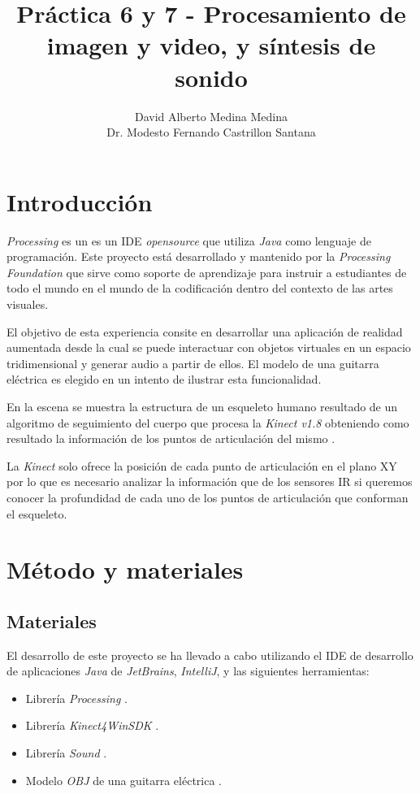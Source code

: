 \documentclass[10pt,a4paper]{report}
\author{David Alberto Medina Medina
	\\
	Dr. Modesto Fernando Castrillon Santana}
\title{Práctica 6 y 7 - Procesamiento de imagen y video, y síntesis de sonido}
\begin{document}
	\maketitle
	\tableofcontents
	
	\chapter{Introducción}
	\textit{Processing} es un es un IDE \textit{opensource} que utiliza \textit{Java} como lenguaje de programación. Este proyecto está desarrollado y mantenido por la \textit{Processing Foundation} que sirve como soporte de aprendizaje para instruir a estudiantes de todo el mundo en el mundo de la codificación dentro del contexto de las artes visuales.
	
	El objetivo de esta experiencia consite en desarrollar una aplicación de realidad aumentada desde la cual se puede interactuar con objetos virtuales en un espacio tridimensional y generar audio a partir de ellos. El modelo de una guitarra eléctrica es elegido en un intento de ilustrar esta funcionalidad. 
	
	En la escena se muestra la estructura de un esqueleto humano resultado de un algoritmo de seguimiento del cuerpo que procesa la \textit{Kinect v1.8} obteniendo como resultado la información de los puntos de articulación del mismo \cite{kinect-controller}. 
	
	La \textit{Kinect} solo ofrece la posición de cada punto de articulación en el plano XY por lo que es necesario analizar la información que de los sensores IR si queremos conocer la profundidad de cada uno de los puntos de articulación que conforman el esqueleto.
	
	\chapter{Método y materiales}
	\section{Materiales}
	El desarrollo de este proyecto se ha llevado a cabo utilizando el IDE de desarrollo de aplicaciones \textit{Java} de \textit{JetBrains}, \textit{IntelliJ}, y las siguientes herramientas:
	\begin{itemize}
		\item Librería \textit{Processing} \cite{processing-javadoc}.
		\item Librería \textit{Kinect4WinSDK} \cite{kinect4winsdk}.
		\item Librería \textit{Sound} \cite{sound-library}.
		\item Modelo \textit{OBJ} de una guitarra eléctrica \cite{3d-guitar-model}.
	\end{itemize}
	
\end{document}
